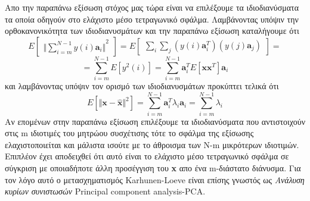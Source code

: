 Απο την παραπάνω εξίσωση στόχος μας τώρα είναι να επιλέξουμε τα ιδιοδιανύσματα τα οποία οδηγούν στο ελάχιστο μέσο τετραγωνικό σφάλμα. Λαμβάνοντας υπόψιν την ορθοκανονικότητα των ιδιοδιανυσμάτων και την παραπάνω εξίσωση καταλήγουμε ότι
\newline\hspace*{\fill}
\begin{equation}
 	Ε   \begin{bmatrix}
	{\Vert \sum_{i=m}^{N-1} y(i)\mathbf{a}_{i} \Vert}^{2}        
        \end{bmatrix}
    = Ε \begin{bmatrix}
	\sum_{i}\sum_{j} (y(i)\mathbf{a}_{i}^{T})(y(j)\mathbf{a}_{j})        
        \end{bmatrix} = 
\end{equation}
\hspace*{\fill}
\newline\hspace*{\fill}
\begin{equation}
    = \sum_{i=m}^{N-1} E[y^{2}(i)]
    = \sum_{i=m}^{N-1} \mathbf{a}_{i}^{T} E[\mathbf{x}\mathbf{x}^{T}]\mathbf{a}_{i}
\end{equation}
\hspace*{\fill}\newline
και λαμβάνοντας υπόψιν τον ορισμό των ιδιοδιανυσμάτων προκύπτει τελικά ότι
\newline\hspace*{\fill}
\begin{equation}
         Ε[{\Vert \mathbf{x}-\mathbf{\widehat{x}} \Vert}^{2}] = \sum_{i=m}^{N-1} \mathbf{a}_{i}^{Τ}\lambda_{i}\mathbf{a}_{i} = 
         \sum_{i=m}^{N-1} \lambda_{i} 
\end{equation}
\hspace*{\fill}\newline
Αν επομένων στην παραπάνω εξίσωση επιλέξουμε τα ιδιοδιανύσματα που αντιστοιχούν στις \textlatin{m} ιδιοτιμές του μητρώου συσχέτισης τότε το σφάλμα της εξίσωσης ελαχιστοποιείται και μάλιστα ισούτε με το άθροισμα των \textlatin{N-m} μικρότερων ιδιοτιμών. Επιπλέον έχει αποδειχθεί ότι αυτό είναι το ελάχιστο μέσο τετραγωνικό σφάλμα σε σύγκριση με οποιαδήποτε άλλη προσέγγιση του \textlatin{\textbf{x}} απο ένα \textlatin{m}-διάστατο διάνυσμα. Για τον λόγο αυτό ο μετασχηματισμός \textlatin{Karhunen-Loeve} είναι επίσης γνωστός ως \textit{Ανάλυση κυρίων συνιστωσών} \textlatin{Principal component analysis-PCA}.

